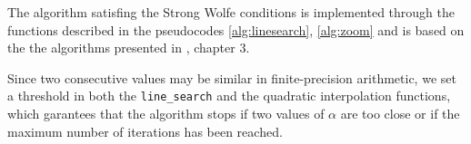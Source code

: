 			The algorithm satisfing the Strong Wolfe conditions is implemented through the functions described in the pseudocodes \ref{alg:linesearch}, \ref{alg:zoom} and is based on the the algorithms presented in \cite{Boyd:2004:CO:993483}, chapter 3.

			Since two consecutive values may be similar in finite-precision arithmetic, we set a threshold in both the \texttt{line\_search} and the quadratic interpolation functions, which garantees that the algorithm stops if two values of $\alpha$ are too close or if the maximum number of iterations has been reached.







